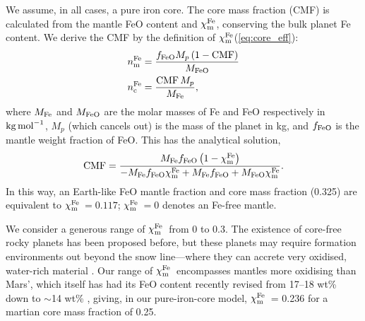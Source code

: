 \documentclass[fleqn,usenatbib]{mnras}
\newcommand{\todo}[1]{\textit{\textcolor{violet}{{#1}}}}
\newcommand{\coreeff}{$\chi^{\rm Fe}_{\rm m}$}
\begin{document}
We assume, in all cases, a pure iron core. The core mass fraction (CMF) is calculated from the mantle FeO content and \coreeff, conserving the bulk planet Fe content. We derive the CMF by the definition of \coreeff (\ref{eq:core_eff}):
\begin{equation}
\begin{split}
    n_{\rm m}^{\rm Fe} &= \frac{f_{\rm FeO} M_p \left(1 - {\rm CMF}\right)}{M_{\rm FeO}} \\
    n_{\rm c}^{\rm Fe} &= \frac{{\rm CMF} \, M_p}{M_{\rm Fe}},
\end{split}
\end{equation}
where $M_{\rm Fe}$ and $M_{\rm FeO}$ are the molar masses of Fe and FeO respectively in ${\rm kg}\,{\rm mol}^{-1}$, $M_p$ (which cancels out) is the mass of the planet in kg, and $f_{\rm FeO}$ is the mantle weight fraction of FeO. This has the analytical solution,
\begin{equation}\label{eq:CMF}
    {\rm CMF} = \frac{M_{\rm Fe} f_{\rm FeO} \left(1 - \chi^{\rm Fe}_{\rm m}\right)}{-M_{\rm Fe} f_{\rm FeO} \chi^{\rm Fe}_{\rm m} + M_{\rm Fe} f_{\rm FeO} +  M_{\rm FeO} \chi^{\rm Fe}_{\rm m}}.
\end{equation}
In this way, an Earth-like FeO mantle fraction \citep[8.05 wt\%;][]{mcdonough_composition_1995} and core mass fraction (0.325) are equivalent to \coreeff$\,= 0.117$; \coreeff$\,= 0$ denotes an Fe-free mantle. 







We consider a generous range of \coreeff~from 0 to 0.3. The existence of core-free rocky planets has been proposed before, but these planets may require formation environments out beyond the snow line---where they can accrete very oxidised, water-rich material \citep{elkins-tanton_coreless_2008, kite_atmosphere_2020}. Our range of \coreeff~encompasses mantles more oxidising than Mars', which itself has had its FeO content recently revised from 17--18 wt\% down to $\sim$14 wt\% \citep{khan_geophysical_2022}, giving, in our pure-iron-core model, \coreeff~= 0.236 for a martian core mass fraction of 0.25. 
\end{document}
